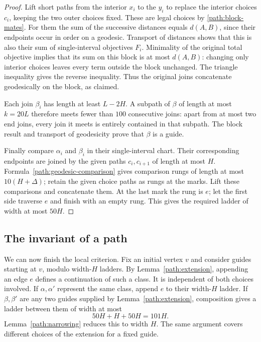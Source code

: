 \documentclass[11pt,reqno]{amsart}
\numberwithin{equation}{section}
\theoremstyle{definition}
\theoremstyle{remark}
\begin{document}
\begin{proof}
Lift short paths from the interior $x_i$ to the $y_i$ to replace the
interior choices $c_i$, keeping the two outer choices fixed.  These are
legal choices by \eqref{path:block-mates}.  For them the sum of the
successive distances equals $d(A,B)$, since their endpoints occur in
order on a geodesic.  Transport of distances shows that this is also
their sum of single-interval objectives $F_i$.  Minimality of the
original total objective implies that its sum on this block is at most
$d(A,B)$: changing only interior choices leaves every term outside the
block unchanged.  The triangle inequality gives the reverse inequality.
Thus the original joins concatenate geodesically on the block, as
claimed.

Each join $\beta_i$ has length at least $L-2H$.  A subpath of $\beta$
of length at most $k=20L$ therefore meets fewer than $100$ consecutive
joins: apart from at most two end joins, every join it meets is entirely
contained in that subpath.  The block result and transport of
geodesicity prove that $\beta$ is a guide.

Finally compare $\alpha_i$ and $\beta_i$ in their single-interval
chart.  Their corresponding endpoints are joined by the given paths
$c_i,c_{i+1}$ of length at most $H$.  Formula~\eqref{path:geodesic-comparison}
gives comparison rungs of length at most $10(H+\Delta)$; retain the
given choice paths as rungs at the marks.  Lift these comparisons and
concatenate them.  At the last mark the rung is $e$; let the first
side traverse $e$ and finish with an empty rung.  This gives the required
ladder of width at most $50H$.
\end{proof}

\subsection{The invariant of a path}

We can now finish the local criterion.  Fix an initial vertex $v$ and
consider guides starting at $v$, modulo width-$H$ ladders.  By
Lemma~\ref{path:extension}, appending an edge $e$ defines a continuation
of such a class.  It is independent of both choices involved.  If
$\alpha,\alpha'$ represent the same class, append $e$ to their
width-$H$ ladder.  If $\beta,\beta'$ are any two guides supplied by
Lemma~\ref{path:extension}, composition gives a ladder between them of
width at most
\[
 50H+H+50H=101H.
\]
Lemma~\ref{path:narrowing} reduces this to width $H$.  The same argument
covers different choices of the extension for a fixed guide.
\end{document}

